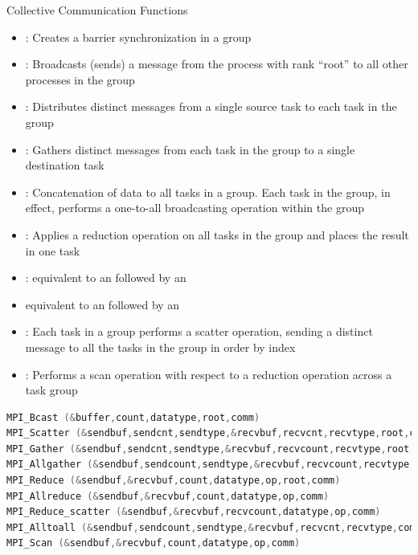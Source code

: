 \documentclass[9pt,c]{beamer}
\begin{document}
\begin{frame}{Collective Communication Functions}
  \begin{itemize}
    \item {}: Creates a barrier synchronization in a group
    \item {}: Broadcasts (sends) a message from the process with rank “root” to all other processes in the group
    \item {}: Distributes distinct messages from a single source task to each task in the group
    \item {}: Gathers distinct messages from each task in the group to a single destination task
    \item {}: Concatenation of data to all tasks in a group. Each task in the group, in effect, performs a one-to-all broadcasting operation within the group
    \item {}: Applies a reduction operation on all tasks in the group and places the result in one task
    \item {}: equivalent to an  followed by an 
    \item {} equivalent to an  followed by an 
    \item {}: Each task in a group performs a scatter operation, sending a distinct message to all the tasks in the group in order by index
    \item {}: Performs a scan operation with respect to a reduction operation across a task group
  \end{itemize}
  \framebreak
  \begin{block}{}
  \begin{lstlisting}[basicstyle=\scriptsize\ttfamily,language=C]
MPI_Bcast (&buffer,count,datatype,root,comm)
MPI_Scatter (&sendbuf,sendcnt,sendtype,&recvbuf,recvcnt,recvtype,root,comm)
MPI_Gather (&sendbuf,sendcnt,sendtype,&recvbuf,recvcount,recvtype,root,comm)
MPI_Allgather (&sendbuf,sendcount,sendtype,&recvbuf,recvcount,recvtype,comm)
MPI_Reduce (&sendbuf,&recvbuf,count,datatype,op,root,comm)
MPI_Allreduce (&sendbuf,&recvbuf,count,datatype,op,comm)
MPI_Reduce_scatter (&sendbuf,&recvbuf,recvcount,datatype,op,comm)
MPI_Alltoall (&sendbuf,sendcount,sendtype,&recvbuf,recvcnt,recvtype,comm)
MPI_Scan (&sendbuf,&recvbuf,count,datatype,op,comm)

\end{lstlisting}
\end{block}
\end{frame}
\end{document}
